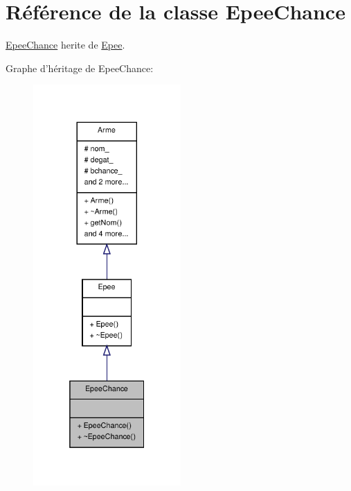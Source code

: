 \hypertarget{class_epee_chance}{\section{Référence de la classe Epee\-Chance}
\label{class_epee_chance}
}


\hyperlink{class_epee_chance}{Epee\-Chance} herite de \hyperlink{class_epee}{Epee}.  




Graphe d'héritage de Epee\-Chance\-:
\nopagebreak
\begin{figure}[H]
\begin{center}
\leavevmode
\includegraphics[width=160pt]{class_epee_chance__inherit__graph}
\end{center}
\end{figure}


